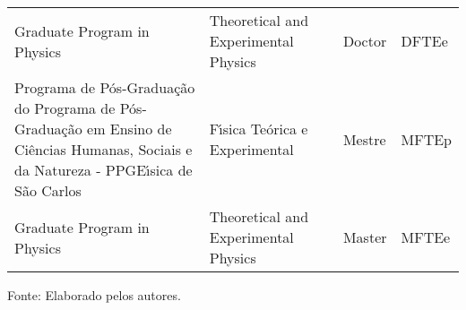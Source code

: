 \begin{apendicesenv}
\begin{quadro}[Htb]
\begin{tabular}{|p{4.5cm}|p{4.0cm}|p{2.0cm}|p{1.5cm}|p{2.25cm}|}
		Graduate Program in Physics & Theoretical and Experimental Physics &  & Doctor & DFTEe\\
		Programa de P\'os-Gradua\c{c}\~ao do Programa de P\'os-Gradua\c{c}\~ao em Ensino de Ci\^encias Humanas, Sociais e da Natureza - PPGE\'{\i}sica de S\~ao Carlos & F\'{\i}sica Te\'orica e Experimental &  & Mestre & MFTEp\\
		Graduate Program in Physics & Theoretical and Experimental Physics &  & Master & MFTEe\\
		\hline
	\end{tabular}
	\begin{flushleft}
		Fonte: Elaborado pelos autores.\
	\end{flushleft}
\end{quadro}


\end{apendicesenv}

